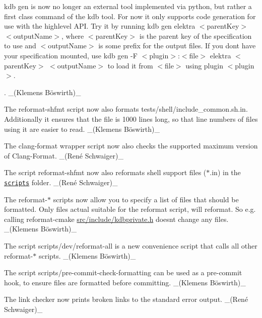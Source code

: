 {\ttfamily kdb gen} is now no longer an external tool implemented via python, but rather a first class command of the {\ttfamily kdb} tool. For now it only supports code generation for use with the highlevel A\+PI. Try it by running {\ttfamily kdb gen elektra $<$parent\+Key$>$ $<$output\+Name$>$}, where {\ttfamily $<$parent\+Key$>$} is the parent key of the specification to use and {\ttfamily $<$output\+Name$>$} is some prefix for the output files. If you don\textquotesingle{}t have your specification mounted, use {\ttfamily kdb gen -\/F $<$plugin$>$\+:$<$file$>$ elektra $<$parent\+Key$>$ $<$output\+Name$>$} to load it from {\ttfamily $<$file$>$} using plugin {\ttfamily $<$plugin$>$}.

. \+\_\+(Klemens Böswirth)\+\_\+


\begin{DoxyItemize}
\item The {\ttfamily reformat-\/shfmt} script now also formats {\ttfamily tests/shell/include\+\_\+common.\+sh.\+in}. Additionally it ensures that the file is 1000 lines long, so that line numbers of files using it are easier to read. \+\_\+(Klemens Böswirth)\+\_\+
\item The clang-\/format wrapper script now also checks the supported maximum version of Clang-\/\+Format. \+\_\+(René Schwaiger)\+\_\+
\item The script {\ttfamily reformat-\/shfmt} now also reformats shell support files ({\ttfamily $\ast$.in}) in the \href{https://master.libelektra.org/scripts}{\texttt{ {\ttfamily scripts}}} folder. \+\_\+(René Schwaiger)\+\_\+
\item The {\ttfamily reformat-\/$\ast$} scripts now allow you to specify a list of files that should be formatted. Only files actual suitable for the reformat script, will reformat. So e.\+g. calling {\ttfamily reformat-\/cmake \mbox{\hyperlink{kdbprivate_8h}{src/include/kdbprivate.\+h}}} doesn\textquotesingle{}t change any files. \+\_\+(Klemens Böswirth)\+\_\+
\item The script {\ttfamily scripts/dev/reformat-\/all} is a new convenience script that calls all other {\ttfamily reformat-\/$\ast$} scripts. \+\_\+(Klemens Böswirth)\+\_\+
\item The script {\ttfamily scripts/pre-\/commit-\/check-\/formatting} can be used as a pre-\/commit hook, to ensure files are formatted before committing. \+\_\+(Klemens Böswirth)\+\_\+
\item The link checker now prints broken links to the standard error output. \+\_\+(René Schwaiger)\+\_\+

\end{DoxyItemize}
